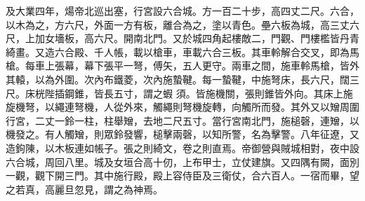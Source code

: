 \begin{pinyinscope}
 及大業四年，煬帝北巡出塞，行宮設六合城。方一百二十步，高四丈二尺。六合，以木為之，方六尺，外面一方有板，離合為之，塗以青色。壘六板為城，高三丈六尺，上加女墻板，高六尺。開南北門。又於城四角起樓敵二，門觀、門樓檻皆丹青綺畫。又造六合殿、千人帳，載以槍車，車載六合三板。其車軨解合交叉，即為馬槍。每車上張幕，幕下張平一弩，傅矢，五人更守。兩車之間，施車軨馬槍，皆外其轅，以為外圍。次內布鐵菱，次內施蟄鞬。每一蟄鞬，中施弩床，長六尺，闊三尺。床桄陛插鋼錐，皆長五寸，謂之蝦
 須。皆施機關，張則錐皆外向。其床上施旋機弩，以繩連弩機，人從外來，觸繩則弩機旋轉，向觸所而發。其外又以矰周圍行宮，二丈一鈴一柱，柱舉矰，去地二尺五寸。當行宮南北門，施槌磬，連矰，以機發之。有人觸矰，則眾鈴發響，槌擊兩磬，以知所警，名為擊警。八年征遼，又造鉤陳，以木板連如帳子。張之則綺文，卷之則直焉。帝御營與賊城相對，夜中設六合城，周回八里。城及女垣合高十仞，上布甲士，立仗建旗。又四隅有闕，面別一觀，觀下開三門。其中施行殿，殿上容侍臣及三衛仗，合六百人。一宿而畢，望之若真，高麗旦忽見，謂之為神焉。



\end{pinyinscope}